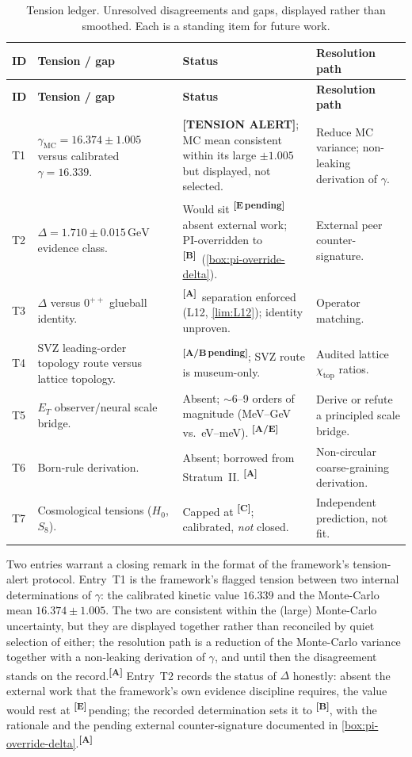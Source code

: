\documentclass[12pt,a4paper,twoside]{article}
\theoremstyle{plain}
\theoremstyle{definition}
\theoremstyle{remark}
\newcommand{\GeV}{\,\mathrm{GeV}}
\newcommand{\catmark}[1]{\textsuperscript{\textsf{\textbf{[#1]}}}}
\newcommand{\DeltaGap}{1.710 \pm 0.015\GeV} %
\newcommand{\GammaGeom}{16.339} %
\newcommand{\GammaMC}{16.374 \pm 1.005} %
\begin{document}
{\small
\renewcommand{\arraystretch}{1.3}
\begin{longtable}{p{} p{} p{} p{}}
\caption{Tension ledger. Unresolved disagreements and gaps, displayed rather than
smoothed. Each is a standing item for future work.}
\label{tab:tensions}\\
\toprule
\textbf{ID} & \textbf{Tension / gap} & \textbf{Status} & \textbf{Resolution path} \\
\midrule
\endfirsthead
\toprule
\textbf{ID} & \textbf{Tension / gap} & \textbf{Status} & \textbf{Resolution path} \\
\midrule
\endhead
\bottomrule
\endfoot
T1 & $\gamma_{\mathrm{MC}} = \GammaMC$ versus calibrated $\gamma = \GammaGeom$. & \textbf{[TENSION ALERT]}; MC mean consistent within its large $\pm1.005$ but displayed, not selected. & Reduce MC variance; non-leaking derivation of $\gamma$. \\
T2 & $\Delta = \DeltaGap$ evidence class. & Would sit \catmark{E\,pending} absent external work; PI-overridden to \catmark{B}\ (\cref{box:pi-override-delta}). & External peer counter-signature. \\
T3 & $\Delta$ versus $0^{++}$ glueball identity. & \catmark{A}\ separation enforced (L12, \cref{lim:L12}); identity unproven. & Operator matching. \\
T4 & SVZ leading-order topology route versus lattice topology. & \catmark{A/B\,pending}; SVZ route is museum-only. & Audited lattice $\chi_{\mathrm{top}}$ ratios. \\
T5 & $E_T$ observer/neural scale bridge. & Absent; $\sim$6--9 orders of magnitude (MeV--GeV vs.\ eV--meV). \catmark{A/E} & Derive or refute a principled scale bridge. \\
T6 & Born-rule derivation. & Absent; borrowed from Stratum~II. \catmark{A} & Non-circular coarse-graining derivation. \\
T7 & Cosmological tensions ($H_0$, $S_8$). & Capped at \catmark{C}; calibrated, \emph{not} closed. & Independent prediction, not fit. \\
\bottomrule
\end{longtable}
}

\noindent Two entries warrant a closing remark in the format of the framework's tension-alert protocol. Entry~T1 is the framework's flagged tension between two internal determinations of $\gamma$: the calibrated kinetic value $16.339$ and the Monte-Carlo mean $16.374 \pm 1.005$. The two are consistent within the (large) Monte-Carlo uncertainty, but they are displayed together rather than reconciled by quiet selection of either; the resolution path is a reduction of the Monte-Carlo variance together with a non-leaking derivation of $\gamma$, and until then the disagreement stands on the record.\catmark{A} Entry~T2 records the status of $\Delta$ honestly: absent the external work that the framework's own evidence discipline requires, the value would rest at \catmark{E}\,pending; the recorded determination sets it to \catmark{B}, with the rationale and the pending external counter-signature documented in \cref{box:pi-override-delta}.\catmark{A}
\end{document}
